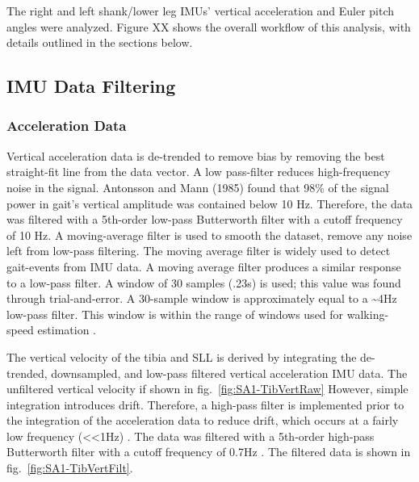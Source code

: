 \documentclass[defaultstyle,11pt]{comps}
\begin{document}
The right and left shank/lower leg IMUs' vertical acceleration and Euler pitch angles were analyzed.
Figure XX shows the overall workflow of this analysis, with details outlined in the sections below.

\hypertarget{imu-data-filtering}{%
\subsection{IMU Data Filtering}\label{imu-data-filtering}}

\hypertarget{acceleration-data}{%
\subsubsection{Acceleration Data}\label{acceleration-data}}

Vertical acceleration data is de-trended to remove bias by removing the best straight-fit line from the data vector.
A low pass-filter reduces high-frequency noise in the signal.
Antonsson and Mann (1985)\citep{Antonsson1985} found that 98\% of the signal power in gait's vertical amplitude was contained below 10 Hz.
Therefore, the data was filtered with a 5th-order low-pass Butterworth filter with a cutoff frequency of 10 Hz.
A moving-average filter is used to smooth the dataset, remove any noise left from low-pass filtering.
The moving average filter is widely used to detect gait-events from IMU data\citep{Han2019}.
A moving average filter produces a similar response to a low-pass filter.
A window of 30 samples (.23s) is used; this value was found through trial-and-error.
A 30-sample window is approximately equal to a \textasciitilde4Hz low-pass filter.
This window is within the range of windows used for walking-speed estimation \citep{Byun2019}.

The vertical velocity of the tibia and SLL is derived by integrating the de-trended, downsampled, and low-pass filtered vertical acceleration IMU data.
The unfiltered vertical velocity if shown in fig.~\ref{fig:SA1-TibVertRaw}
However, simple integration introduces drift.
Therefore, a high-pass filter is implemented prior to the integration of the acceleration data to reduce drift, which occurs at a fairly low frequency (\textless\textless1Hz) \citep{Sekar2015}. The data was filtered with a 5th-order high-pass Butterworth filter with a cutoff frequency of 0.7Hz \citep{Ribeiro1999}. The filtered data is shown in fig.~\ref{fig:SA1-TibVertFilt}.
\end{document}
